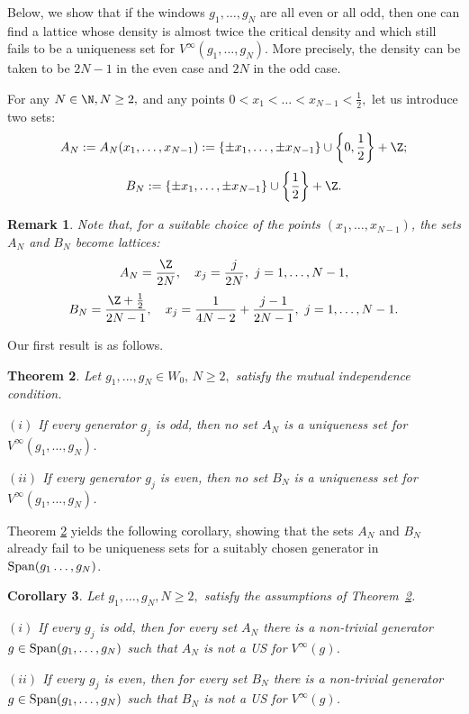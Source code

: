 \documentclass[12pt]{amsart}
\numberwithin{equation}{section}
\newtheorem{theorem}{Theorem}[section]
\newtheorem{remark}[theorem]{Remark}\newtheorem{proposition}[theorem]{Proposition}\newtheorem{definition}[theorem]{Definition}
\newtheorem{corollary}[theorem]{Corollary} \newcommand{\La}{\Lambda}
\begin{document}
Below, we show that if the windows $g_1,\dots,g_N$ are all even or all odd, then one can find a lattice whose density is almost twice the critical density and which still fails to be  a uniqueness set for $V^{\infty}(g_1,\dots,g_N)$. More precisely, the density can be taken to be $2N-1$ in the even case and $2N$ in the odd case.


For any $N\in\N, N\geq 2,$ and any points $0<x_1< \dots <x_{N-1}<\frac{1}{2},$ let us introduce two sets: $$A_N:=A_N(x_1,\dots,x_{N-1}):=\{\pm x_1,\dots,\pm x_{N-1}\}\cup\left\{0,\frac{1}{2}\right\}+\Z;$$$$B_N:=\{\pm x_1,\dots,\pm x_{N-1}\}\cup\left\{\frac{1}{2}\right\}+\Z.$$

\begin{remark}\label{rem:lattice}
    Note that, for a suitable choice of the points $(x_1,\dots,x_{N-1})$, the sets $A_N$ and $B_N$ become lattices:
    $$A_N = \frac{\Z}{2N}, \quad x_j = \frac{j}{2N}, \,\, j=1,\dots, N-1,$$
    $$B_N = \frac{\Z+\frac{1}{2}}{2N-1}, \quad x_j = \frac{1}{4N-2}+\frac{j-1}{2N-1}, \,\, j=1,\dots, N-1.$$
\end{remark}


Our first result is as follows.

\begin{theorem}\label{t} Let  $g_1,...,g_N\in W_0, \, N\geq 2,$ satisfy the mutual independence condition.

$(i)$ If every generator $g_j$ is odd, then no set $A_N$ is a uniqueness set for $V^\infty(g_1,\dots,g_N)$.

$(ii)$ If every generator $g_j$ is even, then no set $B_N$ is a uniqueness set for $V^\infty(g_1,\dots,g_N)$.\end{theorem}
Theorem  \ref{t} yields the following corollary, showing that the sets $A_N$  and $B_N$  already fail to be uniqueness sets for a suitably chosen generator in 
${\rm Span}(g_1\dots,g_N)$.


\begin{corollary} \label{cor:AN_g}
    Let $g_1,\dots,g_N, N\geq 2,$ satisfy the assumptions of Theorem~\ref{t}. 
    
$(i)$ If every $g_j$ is odd, then for every set $A_N$ there is a non-trivial generator $g\in {\rm Span}(g_1,\dots,g_N)$ such that $A_N$ is not a US for $V^\infty(g)$. 

    $(ii)$ If every $g_j$ is even, then for every set $B_N$ there is a non-trivial generator $g\in {\rm Span}(g_1,\dots,g_N)$ such that $B_N$ is not a US for $V^\infty(g)$. 
\end{corollary}
\end{document}
